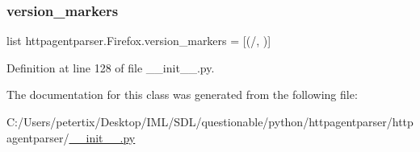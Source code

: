 \subsubsection{\texorpdfstring{version\+\_\+markers}{version\_markers}}
{\footnotesize\ttfamily list httpagentparser.\+Firefox.\+version\+\_\+markers = \mbox{[}(\textquotesingle{}/\textquotesingle{}, \textquotesingle{}\textquotesingle{})\mbox{]}\hspace{0.3cm}{\ttfamily [static]}}



Definition at line 128 of file \+\_\+\+\_\+init\+\_\+\+\_\+.\+py.



The documentation for this class was generated from the following file\+:\begin{DoxyCompactItemize}
\item 
C\+:/\+Users/petertix/\+Desktop/\+I\+M\+L/\+S\+D\+L/questionable/python/httpagentparser/httpagentparser/\hyperlink{____init_____8py}{\+\_\+\+\_\+init\+\_\+\+\_\+.\+py}\end{DoxyCompactItemize}
